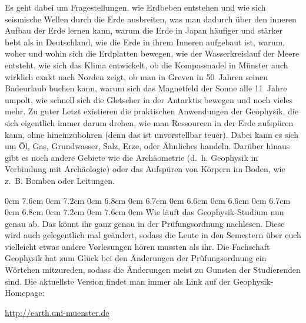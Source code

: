 \begin{multicols}{2}
Es geht dabei um Fragestellungen, wie Erdbeben entstehen und wie sich seismische Wellen durch die Erde ausbreiten, was man dadurch über den inneren Aufbau der Erde lernen kann, warum die Erde in Japan häufiger und stärker bebt als in Deutschland, wie die Erde in ihrem Inneren aufgebaut ist, warum, woher und wohin sich die Erdplatten bewegen, wie der Wasserkreislauf der Meere entsteht, wie sich das Klima entwickelt, ob die Kompassnadel in Münster auch wirklich exakt nach Norden zeigt, ob man in Greven in 50~Jahren seinen Badeurlaub buchen kann, warum sich das Magnetfeld der Sonne alle 11~Jahre umpolt, wie schnell sich die Gletscher in der Antarktis bewegen und noch vieles mehr. Zu guter Letzt existieren die praktischen Anwendungen der Geophysik, die sich eigentlich immer darum drehen, wie man Ressourcen in der Erde aufspüren kann, ohne hineinzubohren (denn das ist unvorstellbar teuer). Dabei kann es sich um Öl, Gas, Grundwasser, Salz, Erze, oder Ähnliches handeln. Darüber hinaus gibt es noch andere Gebiete wie die Archäometrie (d.~h. Geophysik in Verbindung mit Archäologie) oder das Aufspüren von Körpern im Boden, wie z.~B. Bomben oder Leitungen.

0cm 7.6cm
0cm 7.2cm
0cm 6.8cm
0cm 6.7cm
0cm 6.6cm
0cm 6.6cm
0cm 6.7cm
0cm 6.8cm
0cm 7.2cm
0cm 7.6cm
0cm \columnwidth
Wie läuft das Geophysik-Studium nun genau ab. Das könnt ihr ganz genau in der Prüfungsordnung nachlesen. Diese wird auch gelegentlich mal geändert, sodass die Leute in den Semestern über euch vielleicht etwas andere Vorlesungen hören mussten als ihr. Die Fachschaft Geophysik hat zum Glück bei den Änderungen der Prüfungsordnung ein Wörtchen mitzureden, sodass die Änderungen meist zu Gunsten der Studierenden sind. Die aktuellste Version findet man immer als Link auf der Geophysik-Homepage:
\begin{center}
	\vspace{-1em}
\url{http://earth.uni-muenster.de}
\vspace{-1em}
\end{center}


\end{multicols}
